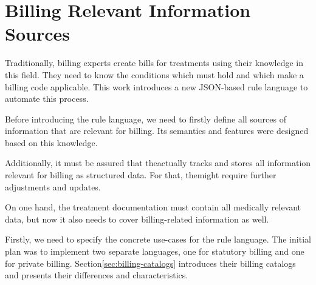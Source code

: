 \section{Billing Relevant Information Sources}\label{sec:billing-relevant-information-sources}

Traditionally, billing experts create bills for treatments using their knowledge in this field.
They need to know the conditions which must hold and which make a billing code applicable.
This work introduces a new JSON-based rule language to automate this process.

Before introducing the rule language,
we need to firstly define all sources of information that are relevant for billing.
Its semantics and features were designed based on this knowledge.

Additionally,
it must be assured that the\AVS actually tracks and stores all information relevant for billing as structured data.
For that, the\AVS might require further adjustments and updates.

On one hand, the treatment documentation must contain all medically relevant data,
but now it also needs to cover billing-related information as well.



Firstly, we need to specify the concrete use-cases for the rule language.
The initial plan was to implement two separate languages, one for statutory billing and one for private billing.
Section\ref{sec:billing-catalogs} introduces their billing catalogs and presents their differences and characteristics.

